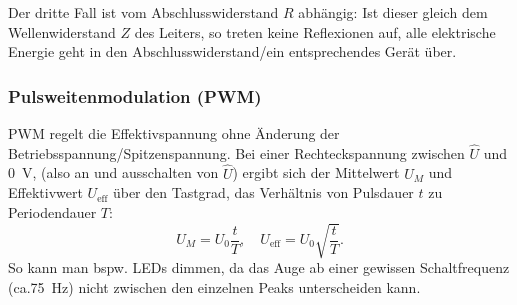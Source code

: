 Der dritte Fall ist vom Abschlusswiderstand \(R\) abhängig: Ist dieser gleich dem Wellenwiderstand \(Z\) des Leiters, so treten keine Reflexionen auf, alle elektrische Energie geht in den Abschlusswiderstand/ein entsprechendes Gerät über.

\subsubsection{Pulsweitenmodulation (PWM)}
PWM regelt die Effektivspannung ohne Änderung der Betriebsspannung/Spitzenspannung. Bei einer Rechteckspannung zwischen \(\hat{U}\) und \qty{0}{\volt}, (also an und ausschalten von \(\hat{U}\)) ergibt sich der Mittelwert \(U_M\) und Effektivwert \(U_\text{eff}\) über den Tastgrad, das Verhältnis von Pulsdauer \(t\) zu Periodendauer \(T\):
\begin{equation}
U_M = U_0 \frac{t}{T}, \quad
U_\text{eff} = U_0 \sqrt{\frac{t}{T}}.
\label{eq:spannungen}
\end{equation}
So kann man bspw. LEDs dimmen, da das Auge ab einer gewissen Schaltfrequenz (ca.\qty{75}{\hertz}) nicht zwischen den einzelnen Peaks unterscheiden kann.
